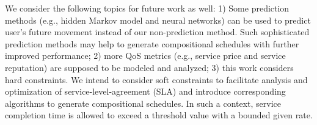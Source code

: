 \documentclass[journal]{IEEEtran}
\begin{document}
We consider the following topics for future work as well: 1) Some prediction methods (e.g., hidden Markov model and neural networks) can be used to predict user's future movement instead of our non-prediction method. Such sophisticated prediction methods may help to generate compositional schedules with further improved performance; 2) more QoS metrics (e.g., service price and service reputation) are supposed to be modeled and  analyzed; 3) this work considers hard constraints.
We intend to consider soft constraints to facilitate analysis and optimization of service-level-agreement (SLA) and introduce corresponding algorithms to generate compositional schedules. In such a context, service completion time is allowed to exceed a threshold value with a bounded given rate. 



\ifCLASSOPTIONcaptionsoff
  \newpage
\fi






\end{document}
